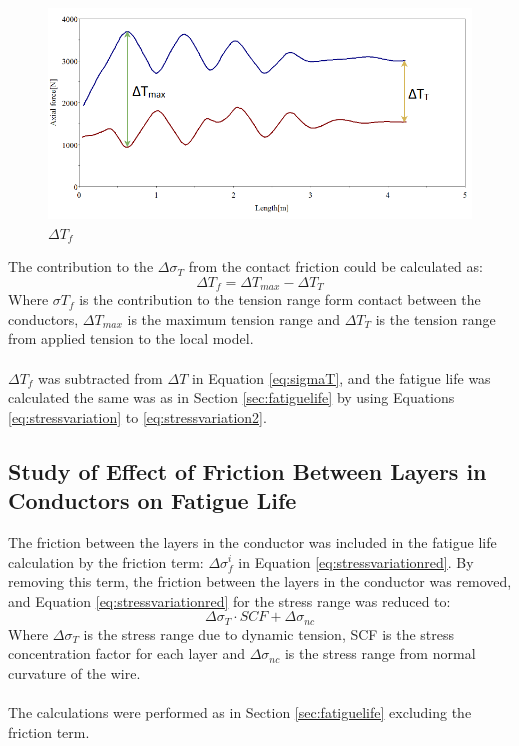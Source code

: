 \begin{figure}[H]
\centering
\includegraphics[scale=0.7]{figures/confric.PNG}
\caption[$\; \:$ $\Delta T_f$]{$\Delta T_f$}
 \label{fig:condfric}
\end{figure}
The contribution to the $\Delta \sigma_T$ from the contact friction could be calculated as:
\begin{equation}
    \Delta T_f = \Delta T_{max} - \Delta T_T
\end{equation}
Where $\sigma T_f$ is the contribution to the tension range form contact between the conductors, $\Delta T_{max}$ is the maximum tension range and $\Delta T_T$ is the tension range from applied tension to the local model.\\\\
$\Delta T_f$ was subtracted from $\Delta T$ in Equation \ref{eq:sigmaT}, and the fatigue life was calculated the same was as in Section \ref{sec:fatiguelife} by using Equations \ref{eq:stressvariation} to \ref{eq:stressvariation2}.

\subsection{Study of Effect of Friction Between Layers in Conductors on Fatigue Life}
The friction between the layers in the conductor was included in the fatigue life calculation by the friction term: $\Delta \sigma_f^i$ in Equation \ref{eq:stressvariationred}. By removing this term, the friction between the layers in the conductor was removed, and Equation \ref{eq:stressvariationred} for the stress range was reduced to:
\begin{equation}
    \Delta \sigma_T \cdot SCF + \Delta \sigma_{nc}
\end{equation}
Where $\Delta \sigma_T$ is the stress range due to dynamic tension, SCF is the stress concentration factor for each layer and $\Delta \sigma_{nc}$ is the stress range from normal curvature of the wire. \\\\
The calculations were performed as in Section \ref{sec:fatiguelife} excluding the friction term. 




